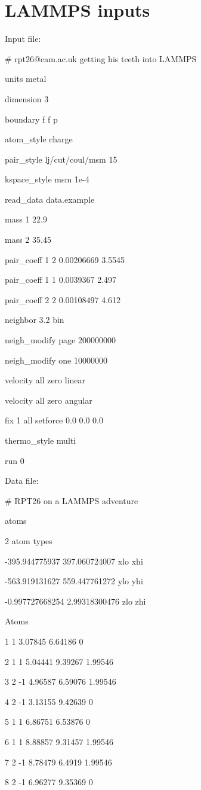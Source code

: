 \section{LAMMPS inputs}
\label{sec:lammps_input}


Input file:
\par\bigskip
\begin{tt}
\# rpt26@cam.ac.uk getting his teeth into LAMMPS
\par\bigskip
units metal


dimension 3


boundary f f p


atom\_style charge


pair\_style lj/cut/coul/msm 15


kspace\_style msm 1e-4


read\_data data.example


mass 1 22.9

mass 2 35.45

pair\_coeff 1 2 0.00206669 3.5545

pair\_coeff 1 1 0.0039367 2.497

pair\_coeff 2 2 0.00108497 4.612

neighbor 3.2 bin

neigh\_modify page 200000000

neigh\_modify one 10000000

velocity all zero linear

velocity all zero angular

fix 1 all setforce 0.0 0.0 0.0  

thermo\_style multi

run 0\end{tt}
\par\bigskip


\noindent
Data file:
\par\bigskip

\begin{tt}

\# RPT26 on a LAMMPS adventure
\par{} atoms

 2 atom types

-395.944775937 397.060724007 xlo xhi

-563.919131627 559.447761272 ylo yhi

-0.997727668254 2.99318300476 zlo zhi


\par\bigskip
Atoms
\par{}  1   1   3.07845   6.64186         0
  

2  1   1   5.04441   9.39267   1.99546

3  2  -1   4.96587   6.59076   1.99546

4  2  -1   3.13155   9.42639         0

5  1   1   6.86751   6.53876         0

6  1   1   8.88857   9.31457   1.99546

7  2  -1   8.78479    6.4919   1.99546

8  2  -1   6.96277   9.35369         0

\end{tt}

